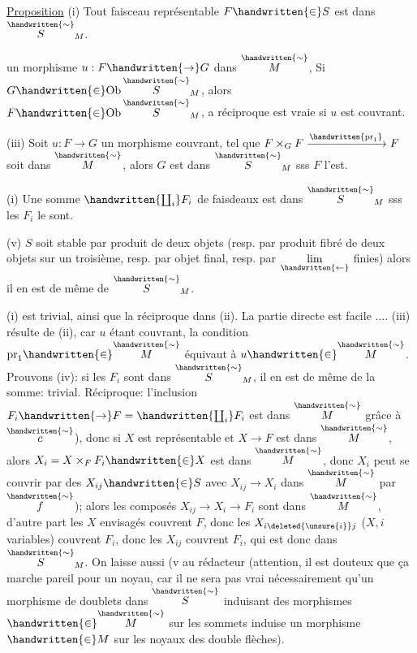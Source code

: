 \uline{Proposition} \quad (i) Tout faisceau représentable $F\handwritten{\in} S$ est dans $\overset{\handwritten{\sim}}{S}_M$. 

 un morphisme $u:F\handwritten{\to}G$  dans $\overset{\handwritten{\sim}}{M}$,  Si $G\handwritten{\in}\mathrm{Ob}\,\overset{\handwritten{\sim}}{S}_M$, alors $F\handwritten{\in}\mathrm{Ob}\,\overset{\handwritten{\sim}}{S}_M$, a réciproque est vraie si $u$ est couvrant.

(iii) Soit $u:F\to G$ un morphisme couvrant, tel que  $F\times_G F\xrightarrow{\handwritten{\mathrm{pr}_1}}F$ soit dans $\overset{\handwritten{\sim}}{M}$, alors $G$ est dans $\overset{\handwritten{\sim}}{S}_M$ sss $F$ l'est.

(i) Une somme $\handwritten{\coprod_i}F_i$ de faisdeaux est dans $\overset{\handwritten{\sim}}{S}_M$ sss les $F_i$ le sont.

(v)  $S$ soit stable par  produit de deux objets (resp. par produit fibré de deux objets sur un  troisième, resp. par objet final, resp. par $\underset{\handwritten{\leftarrow}}{\lim}$ finies) alors il en est de même de $\overset{\handwritten{\sim}}{S}_M$.

(i) est trivial,  ainsi que la réciproque dans (ii). La partie directe est facile .... (iii) résulte de (ii), car $u$ étant couvrant, la condition $\mathrm{pr}_1\handwritten{\in} \overset{\handwritten{\sim}}{M}$ équivaut à $u\handwritten{\in} \overset{\handwritten{\sim}}{M}$. Prouvons (iv): si les $F_i$ sont dans $\overset{\handwritten{\sim}}{S}_M$, il en est de même de la somme: trivial. Réciproque: l'inclusion $F_i\handwritten{\to} F=\handwritten{\coprod_i}F_i$ est dans $\overset{\handwritten{\sim}}{M}$ grâce à $\overset{\handwritten{\sim}}{c}$), donc si $X$ est représentable et $X\to F$ est dans $\overset{\handwritten{\sim}}{M}$, alors $X_i=X\times_F F_i \handwritten{\in} X$ est dans $\overset{\handwritten{\sim}}{M}$, donc $X_i$ peut se couvrir par des $X_{ij}\handwritten{\in} S$ avec $X_{ij}\to X_i$ dans $\overset{\handwritten{\sim}}{M}$ par $\overset{\handwritten{\sim}}{f}$); alors les composés $X_{ij}\to X_i\to F_i$ sont dans $\overset{\handwritten{\sim}}{M}$, d'autre part les $X$ envisagés couvrent $F$, donc les $X_{i\deleted{\unsure{i}}j}$  ($X,i$ variables) couvrent $F_i$, donc les $X_{ij}$ couvrent $F_i$, qui est donc dans $\overset{\handwritten{\sim}}{S}_M$. On laisse aussi (v au rédacteur (attention, il est douteux que ça marche pareil pour un noyau, car il ne sera pas vrai nécessairement qu'un morphisme de doublets dans $\overset{\handwritten{\sim}}{S}$  induisant des morphismes $\handwritten{\in} \overset{\handwritten{\sim}}{M}$ sur les sommets induise un morphisme  $\handwritten{\in} M$ sur les noyaux des double flèches).

